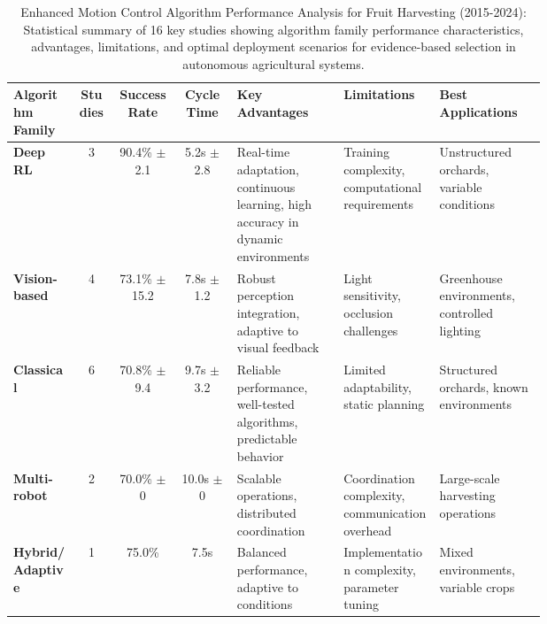 \documentclass{ieeeaccess}
\begin{document}
\begin{table}[htbp]
\centering
\footnotesize
\renewcommand{\arraystretch}{1.2}
\caption{Enhanced Motion Control Algorithm Performance Analysis for Fruit Harvesting (2015-2024): Statistical summary of 16 key studies showing algorithm family performance characteristics, advantages, limitations, and optimal deployment scenarios for evidence-based selection in autonomous agricultural systems.}
\label{tab:motion_control_enhanced}
\begin{tabularx}{\textwidth}{>{\raggedright\arraybackslash}m{0.12\linewidth}ccc>{\raggedright\arraybackslash}m{0.20\linewidth}>{\raggedright\arraybackslash}m{0.18\linewidth}>{\raggedright\arraybackslash}m{0.20\linewidth}}
\toprule
\textbf{Algorithm Family} & \textbf{Studies} & \textbf{Success Rate} & \textbf{Cycle Time} & \textbf{Key Advantages} & \textbf{Limitations} & \textbf{Best Applications} \\
\midrule
\textbf{Deep RL} & 3 & 90.4\% $\pm$ 2.1 & 5.2s $\pm$ 2.8 & Real-time adaptation, continuous learning, high accuracy in dynamic environments & Training complexity, computational requirements & Unstructured orchards, variable conditions \\
\midrule
\textbf{Vision-based} & 4 & 73.1\% $\pm$ 15.2 & 7.8s $\pm$ 1.2 & Robust perception integration, adaptive to visual feedback & Light sensitivity, occlusion challenges & Greenhouse environments, controlled lighting \\
\midrule
\textbf{Classical} & 6 & 70.8\% $\pm$ 9.4 & 9.7s $\pm$ 3.2 & Reliable performance, well-tested algorithms, predictable behavior & Limited adaptability, static planning & Structured orchards, known environments \\
\midrule
\textbf{Multi-robot} & 2 & 70.0\% $\pm$ 0 & 10.0s $\pm$ 0 & Scalable operations, distributed coordination & Coordination complexity, communication overhead & Large-scale harvesting operations \\
\midrule
\textbf{Hybrid/Adaptive} & 1 & 75.0\% & 7.5s & Balanced performance, adaptive to conditions & Implementation complexity, parameter tuning & Mixed environments, variable crops \\
\bottomrule
\end{tabularx}
\end{table}
\end{document}
